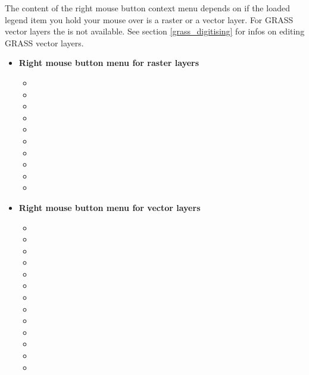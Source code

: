 The content of the right mouse button context menu depends on if the loaded legend item you hold your 
mouse over is a raster or a vector layer. For GRASS vector layers the  is not 
available. See section \ref{grass_digitising} for infos on editing GRASS vector layers. 

\begin{itemize}

\item \textbf{Right mouse button menu for raster layers}
\begin{itemize}
\item {}
\item {}
\item {}
\item {}
\item {}
\item {}
\item {}
\item {}
\item {}
\item {}
\end{itemize}

\item \textbf{Right mouse button menu for vector layers}
\begin{itemize}
\item {}
\item {}
\item {}
\item {}
\item {}
\item {}
\item {}
\item {}
\item {}
\item {}
\item {}
\item {}
\item {}
\end{itemize}


\end{itemize}
